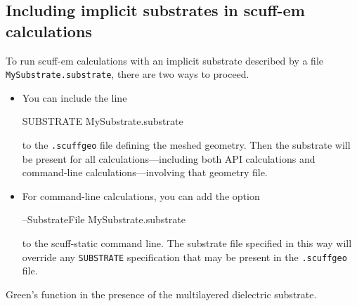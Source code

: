 \documentclass[letterpaper]{article}
\begin{document}
\subsection{Including implicit substrates in {\sc scuff-em} 
            calculations}

To run {\sc scuff-em} calculations with an implicit 
substrate described by a file \texttt{MySubstrate.substrate},
there are two ways to proceed.

\begin{itemize}
 \item You can include the line

       \begin{verbcode}
         SUBSTRATE MySubstrate.substrate
       \end{verbcode}

       to the \texttt{.scuffgeo} file defining the meshed geometry.
       Then the substrate will be present for all calculations---including
       both API calculations and command-line calculations---involving 
       that geometry file.
 \item For command-line calculations, you can add the option

       \begin{verbcode}
       --SubstrateFile MySubstrate.substrate \end{verbcode} to the {\sc scuff-static} command line.  The substrate file specified in this way will override any \texttt{SUBSTRATE} specification that may be present in the \texttt{.scuffgeo} file.  \end{itemize} %
 Green's function in the presence of the multilayered dielectric
 substrate.
\end{document}
